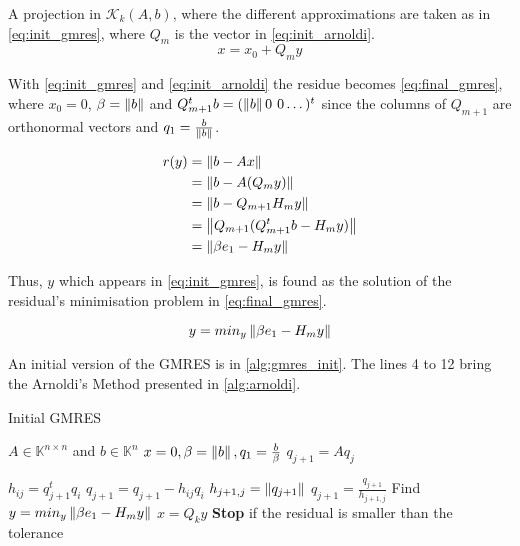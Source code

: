 
    A projection in $\mathcal{K}_{k}(A,b)$, where the different approximations are taken as in \ref{eq:init_gmres}, where $Q_{m}$ is the vector in \ref{eq:init_arnoldi}.
    \begin{equation}\label{eq:init_gmres}
        x = x_{0} + Q_{m}y
    \end{equation}

    With \ref{eq:init_gmres} and \ref{eq:init_arnoldi} the residue becomes \ref{eq:final_gmres}, where $x_{0} = 0$, $\beta=\left\lVert b\right\rVert$ and $Q_{m+1}^{t}b=(\left\lVert b\right\rVert 0 \hspace{0.05in} 0\dots)^{t}$ since the columns of $Q_{m+1}$ are orthonormal vectors and $q_{1} = \frac{b}{\left\lVert b\right\rVert}$. 

    \begin{align} \label{eq:final_gmres}
    \begin{split}
        r(y) &= \left\lVert b - Ax\right\rVert\\ 
        &= \left\lVert b - A(Q_{m}y)\right\rVert\\ 
        &= \left\lVert b-Q_{m+1}H_{m}y\right\rVert \\
        &= \left\lVert Q_{m+1}(Q_{m+1}^{t}b-H_{m}y)\right\rVert \\
        &= \left\lVert\beta e_{1} - H_{m}y\right\rVert
    \end{split}
    \end{align}

    
    Thus, $y$ which appears in \ref{eq:init_gmres}, is found as the solution of the residual's minimisation problem  in \ref{eq:final_gmres}.

    \begin{equation}\label{eq:y_gmres}
        y = min_{y} \left\lVert\beta e_{1} - H_{m}y\right\rVert
    \end{equation}

    An initial version of the GMRES is in \ref{alg:gmres_init}. The lines 4 to 12 bring the Arnoldi's Method presented in \ref{alg:arnoldi}.
    
    \begin{algorithm}
    \caption{Initial GMRES}\label{alg:gmres_init}
    \begin{algorithmic}[1]
    \State $A \in \mathbb{K}^{n \times n}$ and $b\in \mathbb{K}^{n}$
    \State $x=0, \beta=\left\lVert b\right\rVert,q_{1}=\frac{b}{\beta}$
    \State $q_{j+1} = Aq_{j}$

    \State $h_{ij}= q_{j+1}^{t}q_{i}$
    \State $q_{j+1} = q_{j+1} - h_{ij}q_{i}$
    \EndFor
    \State $h_{j+1,j}=\left\lVert q_{j+1}\right\rVert$
    \State $q_{j+1} = \frac{q_{j+1}}{h_{j+1,j}}$
    \EndFor
    \State Find $y = min_{y} \left\lVert\beta e_{1} - H_{m}y\right\rVert$
    \State $x = Q_{k}y$
    \State \textbf{Stop} if the residual is smaller than the tolerance 
    \EndFor
    \end{algorithmic}
    \end{algorithm}

